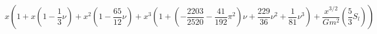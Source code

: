 \begin{equation}
x( 
1
+x \left(1 -\frac{1}{3} \nu\right)
+x^2 \left(1 -\frac{65}{12} \nu\right)
+x^3 \left(
1+\left(-\frac{2203}{2520}-\frac{41}{192}\pi^2\right)\nu + \frac{229}{36} \nu^2 + \frac{1}{81}\nu^3\right) 
+\frac{x^{3/2}}{G m^2}\left(\frac{5}{3}S_{l}\right)
)
\end{equation}